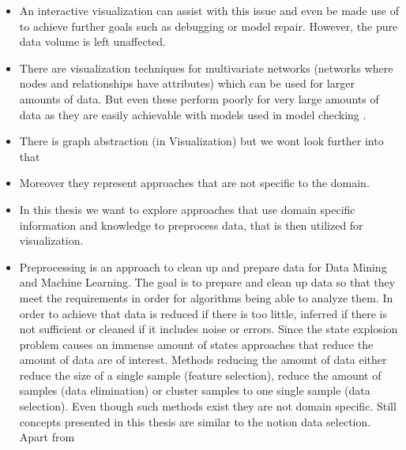 \documentclass[preview]{standalone}
\begin{document}
\begin{itemize}
	\item An interactive visualization can assist with this issue and even be made use of to achieve further goals such as debugging or model repair. However, the pure data volume is left unaffected.
	\item There are visualization techniques for multivariate networks (networks where nodes and relationships have attributes) which can be used for larger amounts of data. But even these perform poorly for very large amounts of data as they are easily achievable with models used in model checking \cite{Kerren2014,Nobre2019}. 
	\item There is graph abstraction (in Visualization) but we wont look further into that
	\item Moreover they represent approaches that are not specific to the domain.
	\item In this thesis we want to explore approaches that use domain specific information and knowledge to preprocess data, that is then utilized for visualization.
	\item Preprocessing is an approach to clean up and prepare data for Data Mining and Machine Learning. The goal is to prepare and clean up data so that they meet the requirements in order for algorithms being able to analyze them. In order to achieve that data is reduced if there is too little, inferred if there is not sufficient or cleaned if it includes noise or errors. Since the state explosion problem causes an immense amount of states approaches that reduce the amount of data are of interest. Methods reducing the amount of data either reduce the size of a single sample (feature selection), reduce the amount of samples (data elimination) or cluster samples to one single sample (data selection)\cite{Famili1997,Garcia2016}. Even though such methods exist they are not domain specific. Still concepts presented in this thesis are similar to the notion data selection.
	Apart from
	

\end{itemize}
\end{document}
